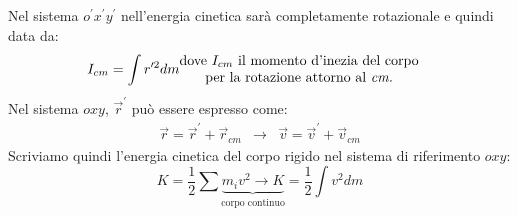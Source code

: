\documentclass{book}
\begin{document}
Nel sistema $o^\prime x^\prime y^\prime$ nell'energia cinetica sarà completamente
rotazionale e quindi data da:
\begin{eqnarray*}
  I_{cm}=\int r^{\prime2} dm & \begin{matrix}
                                 \text{dove $I_{cm}$ il momento d'inezia del corpo}\\
                                 \text{per la rotazione attorno al \it cm.}
                               \end{matrix}
\end{eqnarray*}
Nel sistema $oxy$, $\vec{r}^\prime$ può essere espresso come:
\begin{eqnarray*}
  \vec{r}=\vec{r}^\prime+\vec{r}_{cm} & \to & \vec{v}=\vec{v}^\prime+\vec{v}_{cm}
\end{eqnarray*}
Scriviamo quindi l'energia cinetica del corpo rigido nel sistema di riferimento $oxy$:
\begin{equation}
  K=\frac{1}{2}\displaystyle\sum \underbrace{m_iv^2\to K}_{\text{corpo continuo}}=
  \frac{1}{2}\int v^2 dm
\end{equation}


\end{document}
